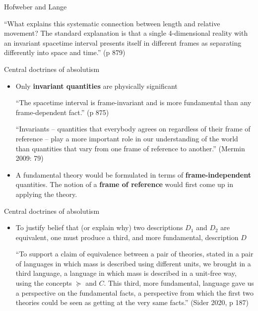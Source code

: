 \documentclass[fleqn]{beamer}
\begin{document}
\begin{frame}{Hofweber and Lange}

  ``What explains this systematic connection between length and
  relative movement? The standard explanation is that a single
  4-dimensional reality with an invariant spacetime interval presents
  itself in different frames as separating differently into space and
  time.'' (p 879)
  

\end{frame}


\begin{frame}{Central doctrines of absolutism}

  \begin{itemize}
  \item Only \textbf{invariant quantities} are physically significant

    \medskip ``The spacetime interval is frame-invariant and is more
    fundamental than any frame-dependent fact.'' (p 875)
    
    \smallskip ``Invariants -- quantities that everybody agrees on
    regardless of their frame of reference -- play a more important
    role in our understanding of the world than quantities that vary
    from one frame of reference to another.'' (Mermin 2009: 79)
    
  \item A fundamental theory would be formulated in terms of
    \textbf{frame-independent} quantities. The notion of a
    \textbf{frame of reference} would first come up in applying the
    theory.

  \end{itemize}
\end{frame}

\begin{frame}{Central doctrines of absolutism}

  \begin{itemize}
    
  \item To justify belief that (or explain why) two descriptions $D_1$
    and $D_2$ are equivalent, one must produce a third, and more
    fundamental, description $D$

    \medskip ``To support a claim of equivalence between a pair of
    theories, stated in a pair of languages in which mass is described
    using different units, we brought in a third language, a language
    in which mass is described in a unit-free way, using the concepts
    $\succeq$ and $C$. This third, more fundamental, language gave us
    a perspective on the fundamental facts, a perspective from which
    the first two theories could be seen as getting at the very same
    facts.'' (Sider 2020, p 187)
  \end{itemize}


\end{frame}
\end{document}
